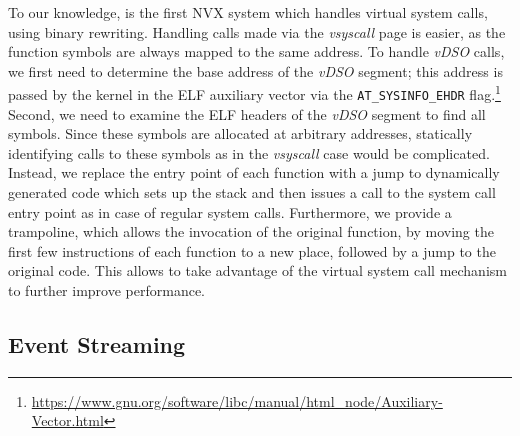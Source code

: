 To our knowledge, \varan is the first NVX system which handles virtual
system calls, using binary rewriting. 
Handling calls made via the \emph{vsyscall} page is easier, as
the function symbols are always mapped to the same address.  
To handle \emph{vDSO} calls, we first need to
determine the base address of the \emph{vDSO} segment; this address
is passed by the kernel in the ELF auxiliary vector via the
\lstinline`AT_SYSINFO_EHDR`
flag.\footnote{\url{https://www.gnu.org/software/libc/manual/html_node/Auxiliary-Vector.html}}
Second, we need to examine the ELF headers of the \emph{vDSO}
segment to find all symbols.  Since these symbols are allocated at
arbitrary addresses, statically identifying calls to these symbols as
in the \emph{vsyscall} case would be complicated. Instead, we
replace the entry point of each function with a jump to dynamically
generated code which sets up the stack and then issues a call to the
\varan system call entry point as in case of regular system
calls. Furthermore, we provide a trampoline, which allows the
invocation of the original function, by moving the first few
instructions of each function to a new place, followed by a jump to
the original code. This allows \varan to take advantage of the virtual
system call mechanism to further improve performance.




\subsection{Event Streaming}
\label{sec:streaming}



